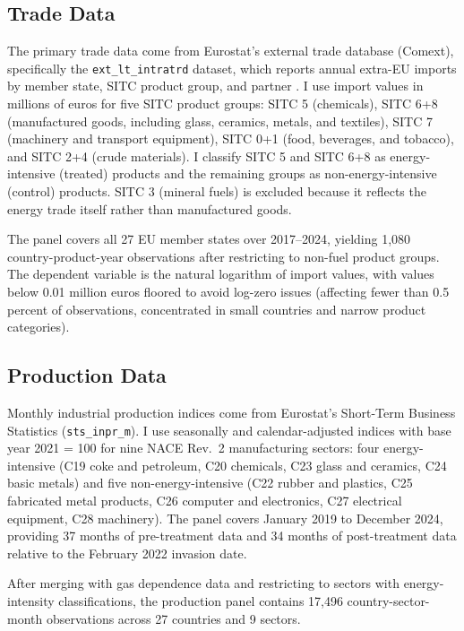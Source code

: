 \documentclass[12pt]{article}
\begin{document}
\subsection{Trade Data}

The primary trade data come from Eurostat's external trade database (Comext), specifically the \texttt{ext\_lt\_intratrd} dataset, which reports annual extra-EU imports by member state, SITC product group, and partner \citep{eurostat2023}. I use import values in millions of euros for five SITC product groups: SITC 5 (chemicals), SITC 6+8 (manufactured goods, including glass, ceramics, metals, and textiles), SITC 7 (machinery and transport equipment), SITC 0+1 (food, beverages, and tobacco), and SITC 2+4 (crude materials). I classify SITC 5 and SITC 6+8 as energy-intensive (treated) products and the remaining groups as non-energy-intensive (control) products. SITC 3 (mineral fuels) is excluded because it reflects the energy trade itself rather than manufactured goods.

The panel covers all 27 EU member states over 2017--2024, yielding 1,080 country-product-year observations after restricting to non-fuel product groups. The dependent variable is the natural logarithm of import values, with values below 0.01 million euros floored to avoid log-zero issues (affecting fewer than 0.5 percent of observations, concentrated in small countries and narrow product categories).

\subsection{Production Data}

Monthly industrial production indices come from Eurostat's Short-Term Business Statistics (\texttt{sts\_inpr\_m}). I use seasonally and calendar-adjusted indices with base year 2021 = 100 for nine NACE Rev.\ 2 manufacturing sectors: four energy-intensive (C19 coke and petroleum, C20 chemicals, C23 glass and ceramics, C24 basic metals) and five non-energy-intensive (C22 rubber and plastics, C25 fabricated metal products, C26 computer and electronics, C27 electrical equipment, C28 machinery). The panel covers January 2019 to December 2024, providing 37 months of pre-treatment data and 34 months of post-treatment data relative to the February 2022 invasion date.

After merging with gas dependence data and restricting to sectors with energy-intensity classifications, the production panel contains 17,496 country-sector-month observations across 27 countries and 9 sectors.
\end{document}
